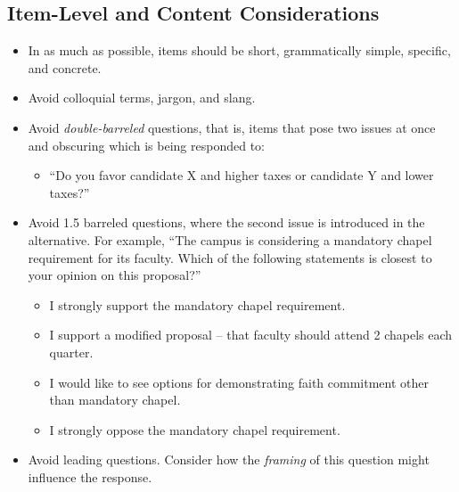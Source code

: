 \documentclass[
  english,
]{book}
\providecommand{\tightlist}{%
  \setlength{\itemsep}{0pt}\setlength{\parskip}{0pt}}
\begin{document}
\hypertarget{item-level-and-content-considerations}{%
\subsection{Item-Level and Content Considerations}\label{item-level-and-content-considerations}}

\begin{itemize}
\tightlist
\item
  In as much as possible, items should be short, grammatically simple, specific, and concrete.
\item
  Avoid colloquial terms, jargon, and slang.
\item
  Avoid \emph{double-barreled} questions, that is, items that pose two issues at once and obscuring which is being responded to:

  \begin{itemize}
  \tightlist
  \item
    ``Do you favor candidate X and higher taxes or candidate Y and lower taxes?''
  \end{itemize}
\item
  Avoid 1.5 barreled questions, where the second issue is introduced in the alternative. For example, ``The campus is considering a mandatory chapel requirement for its faculty. Which of the following statements is closest to your opinion on this proposal?''

  \begin{itemize}
  \tightlist
  \item
    I strongly support the mandatory chapel requirement.
  \item
    I support a modified proposal -- that faculty should attend 2 chapels each quarter.
  \item
    I would like to see options for demonstrating faith commitment other than mandatory chapel.
  \item
    I strongly oppose the mandatory chapel requirement.
  \end{itemize}
\item
  Avoid leading questions. Consider how the \emph{framing} of this question might influence the response.


\end{itemize}
\end{document}

